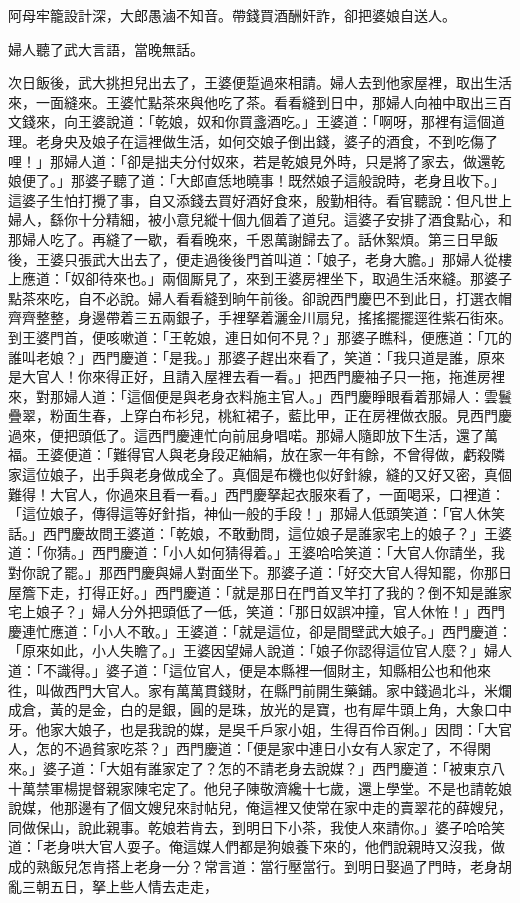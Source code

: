 阿母牢籠設計深，大郎愚滷不知音。帶錢買酒酬奸詐，卻把婆娘自送人。{}

婦人聽了武大言語，當晚無話。

次日飯後，武大挑担兒出去了，王婆便踅過來相請。婦人去到他家屋裡，取出生活來，一面縫來。王婆忙點茶來與他吃了茶。看看縫到日中，那婦人向袖中取出三百文錢來，向王婆說道：「乾娘，奴和你買盞酒吃。」王婆道：「啊呀，那裡有這個道理。老身央及娘子在這裡做生活，如何交娘子倒出錢，婆子的酒食，不到吃傷了哩！」{}那婦人道：「卻是拙夫分付奴來，若是乾娘見外時，只是將了家去，做還乾娘便了。」那婆子聽了道：「大郎直恁地曉事！既然娘子這般說時，老身且收下。」這婆子生怕打攪了事，自又添錢去買好酒好食來，殷勤相待。看官聽說：但凡世上婦人，繇你十分精細，被小意兒縱十個九個着了道兒。這婆子安排了酒食點心，和那婦人吃了。再縫了一歇，看看晚來，千恩萬謝歸去了。話休絮煩。第三日早飯後，王婆只張武大出去了，便走過後後門首叫道：「娘子，老身大膽。」那婦人從樓上應道：「奴卻待來也。」兩個厮見了，來到王婆房裡坐下，取過生活來縫。那婆子點茶來吃，自不必說。婦人看看縫到晌午前後。卻說西門慶巴不到此日，{}打選衣帽齊齊整整，身邊帶着三五兩銀子，手裡拏着灑金川扇兒，搖搖擺擺逕徃紫石街來。到王婆門首，便咳嗽道：「王乾娘，連日如何不見？」那婆子瞧科，便應道：「兀的誰叫老娘？」西門慶道：「是我。」那婆子趕出來看了，笑道：「我只道是誰，原來是大官人！你來得正好，且請入屋裡去看一看。」把西門慶袖子只一拖，拖進房裡來，對那婦人道：「這個便是與老身衣料施主官人。」西門慶睜眼看着那婦人：雲鬟疊翠，粉面生春，上穿白布衫兒，桃紅裙子，藍比甲，正在房裡做衣服。見西門慶過來，便把頭低了。{}這西門慶連忙向前屈身唱喏。那婦人隨即放下生活，還了萬福。王婆便道：「難得官人與老身段疋紬絹，放在家一年有餘，不曾得做，虧殺隣家這位娘子，出手與老身做成全了。真個是布機也似好針線，縫的又好又密，真個難得！大官人，你過來且看一看。」西門慶拏起衣服來看了，一面喝采，口裡道：「這位娘子，傳得這等好針指，神仙一般的手段！」那婦人低頭笑道：「官人休笑話。」{}西門慶故問王婆道：「乾娘，不敢動問，這位娘子是誰家宅上的娘子？」王婆道：「你猜。」西門慶道：「小人如何猜得着。」王婆哈哈笑道：「大官人你請坐，我對你說了罷。」那西門慶與婦人對面坐下。那婆子道：「好交大官人得知罷，你那日屋簷下走，打得正好。」西門慶道：「就是那日在門首叉竿打了我的？倒不知是誰家宅上娘子？」婦人分外把頭低了一低，笑道：「那日奴誤冲撞，官人休恠！」{}西門慶連忙應道：「小人不敢。」王婆道：「就是這位，卻是間壁武大娘子。」西門慶道：「原來如此，小人失瞻了。」王婆因望婦人說道：「娘子你認得這位官人麼？」婦人道：「不識得。」婆子道：「這位官人，便是本縣裡一個財主，知縣相公也和他來徃，叫做西門大官人。家有萬萬貫錢財，在縣門前開生藥鋪。家中錢過北斗，米爛成倉，黃的是金，白的是銀，圓的是珠，放光的是寶，也有犀牛頭上角，大象口中牙。他家大娘子，也是我說的媒，是吳千戶家小姐，生得百伶百俐。」因問：「大官人，怎的不過貧家吃茶？」西門慶道：「便是家中連日小女有人家定了，不得閑來。」婆子道：「大姐有誰家定了？怎的不請老身去說媒？」西門慶道：「被東京八十萬禁軍楊提督親家陳宅定了。他兒子陳敬濟纔十七歲，還上學堂。不是也請乾娘說媒，他那邊有了個文嫂兒來討帖兒，俺這裡又使常在家中走的賣翠花的薛嫂兒，同做保山，說此親事。乾娘若肯去，到明日下小茶，我使人來請你。」婆子哈哈笑道：「老身哄大官人耍子。俺這媒人們都是狗娘養下來的，他們說親時又沒我，做成的熟飯兒怎肯搭上老身一分？常言道：當行壓當行。到明日娶過了門時，老身胡亂三朝五日，拏上些人情去走走，